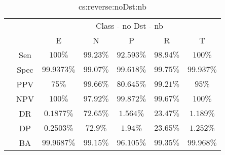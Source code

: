 \begin{table}[!ht]
	\centering
	\begin{tabular}{|c|c|c|c|c|c|c|}
		\cline{3-7}
		\multicolumn{2}{c|}{} & \multicolumn{5}{c|}{Class - no Dst - nb} \\ \cline{3-7}
		\multicolumn{2}{c|}{} & E & N & P & R & T \\ \hline
		\multirow{7}{*}{\rotatebox{90}{Statistics}} & Sen & $100\%$ & $99.23\%$ & $92.593\%$ & $98.94\%$ & $100\%$ \\ \cline{2-7}
		 & Spec & $99.9373\%$ & $99.07\%$ & $99.618\%$ & $99.75\%$ & $99.937\%$ \\ \cline{2-7}
		 & PPV & $75\%$ & $99.66\%$ & $80.645\%$ & $99.21\%$ & $95\%$ \\ \cline{2-7}
		 & NPV & $100\%$ & $97.92\%$ & $99.872\%$ & $99.67\%$ & $100\%$ \\ \cline{2-7}
		 & DR & $0.1877\%$ & $72.65\%$ & $1.564\%$ & $23.47\%$ & $1.189\%$ \\ \cline{2-7}
		 & DP & $0.2503\%$ & $72.9\%$ & $1.94\%$ & $23.65\%$ & $1.252\%$ \\ \cline{2-7}
		 & BA & $99.9687\%$ & $99.15\%$ & $96.105\%$ & $99.35\%$ & $99.968\%$ \\ \hline
	\end{tabular}
	\caption{cs:reverse:noDst:nb}
	\label{tab:cs:reverse:noDst:nb}
\end{table}
